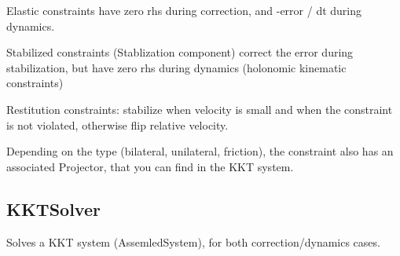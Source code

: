 \documentclass{article}
\begin{document}
Elastic constraints have zero rhs during correction, and -error / dt
during dynamics.

Stabilized constraints (Stablization component) correct the error
during stabilization, but have zero rhs during dynamics (holonomic
kinematic constraints)

Restitution constraints: stabilize when velocity is small and when the constraint is not violated,
otherwise flip relative velocity.

Depending on the type (bilateral, unilateral, friction), the
constraint also has an associated Projector, that you can find in the
KKT system.

\subsection{KKTSolver}
Solves a KKT system (AssemledSystem), for both correction/dynamics cases.
\end{document}
